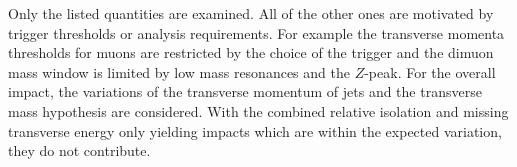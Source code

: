  
Only the listed quantities are examined. All of the other ones are motivated by trigger thresholds or analysis requirements. For example the transverse momenta thresholds for muons are restricted by the choice of the trigger and the dimuon mass window is limited by low mass resonances and the $Z$-peak. For the overall impact, the variations of the transverse momentum of jets and the transverse mass hypothesis are considered. With the combined relative isolation and missing transverse energy only yielding impacts which are within the expected variation, they do not contribute. 


